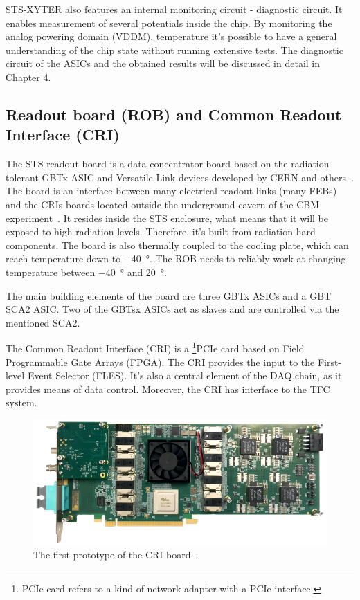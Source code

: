 STS-XYTER also features an internal monitoring circuit - diagnostic circuit. It enables measurement of several potentials inside the chip. By monitoring the analog powering domain (VDDM), temperature it's possible to have a general understanding of the chip state without running extensive tests. The diagnostic circuit of the \glspl{ASIC} and the obtained results will be discussed in detail in Chapter 4.

\subsection{Readout board (ROB) and Common Readout Interface (CRI)}

The \gls{STS} readout board is a data concentrator board based on the radiation-tolerant GBTx ASIC and Versatile Link
devices developed by CERN and others~\cite{Bonacini:1235849, C_2013}. The board is an interface between many electrical readout links (many \glspl{FEB}) and the \glspl{CRI} boards located outside the underground cavern of the \gls{CBM} experiment~\cite{Lehnert_2017}. It resides inside the \gls{STS} enclosure, what means that it will be exposed to high radiation levels. Therefore, it's built from radiation hard components. The board is also thermally coupled to the cooling plate, which can reach temperature down to \SI{-40}{\degree}. The \gls{ROB} needs to reliably work at changing temperature between \SI{-40}{\degree} and \SI{20}{\degree}. 

The main building elements of the board are three \gls{GBT}x \glspl{ASIC} and a \gls{GBT} \gls{SCA2} \gls{ASIC}. Two of the \glspl{GBT}x \glspl{ASIC} act as slaves and are controlled via the mentioned \gls{SCA2}. 

The Common Readout Interface (\gls{CRI}) is a \footnote{PCIe card refers to a kind of network adapter with a PCIe interface.}{PCIe card} based on Field Programmable Gate Arrays (\gls{FPGA}). The \gls{CRI} provides the input to the First-level Event Selector (\gls{FLES}). It's also a central element of the \gls{DAQ} chain, as it provides means of data control. Moreover, the \gls{CRI} has interface to the \gls{TFC} system. 
\begin{figure}[!h]
\centering
\includegraphics[width=0.7\columnwidth]{Chapter2/images/cri_board_atlas.pdf}
\caption{The first prototype of the \gls{CRI} board~\cite{CRI}.}
\label{fig_cri_board}
\end{figure}


